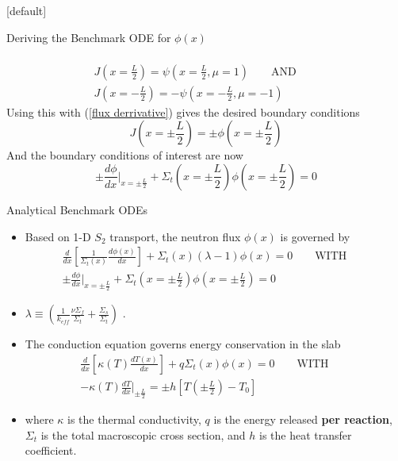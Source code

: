 \documentclass[9pt,t,aspectratio=169]{beamer}
\makeatletter
\newcommand{\QAND}{\qquad \text{AND} \qquad}
\newcommand{\QWITH}{\qquad \text{WITH} \qquad}
\newenvironment{withoutheadline}{
       \setbeamertemplate{headline}[default]
       \def\beamer@entrycode{\vspace*{-\headheight}}
    }{}
\makeatother
\begin{document}
\begin{withoutheadline}
\begin{frame}[allowframebreaks]{Deriving the Benchmark ODE for $\phi(x)$}
\begin{itemize}
\begin{multline}
        \end{multline}
        \vspace*{-0.4cm}
        \begin{multline}
            J(x=\frac{L}{2}) = \psi(x=\frac{L}{2},\mu =1) \QAND \\ J(x=-\frac{L}{2}) = - \psi(x=-\frac{L}{2},\mu =-1)
        \end{multline}
        Using this with (\ref{flux derrivative}) gives the desired boundary conditions
        \begin{equation}
            J(x=\pm \frac{L}{2}) = \pm \phi(x=\pm \frac{L}{2})
        \end{equation}
        And the boundary conditions of interest are now
        \begin{equation}
            \pm \frac{d\phi}{dx}\bigg|_{x=\pm \frac{L}{2}} +  \Sigma_{t}(x=\pm \frac{L}{2})  \phi(x=\pm \frac{L}{2})  = 0
        \end{equation}
    \end{itemize}
\end{frame}
\end{withoutheadline}

\begin{frame}{Analytical Benchmark ODEs}
    \vspace*{-0.25cm}
    \begin{itemize}
        \item Based on 1-D $S_{2}$ transport, the neutron flux $\phi(x)$ is governed by
        \begin{multline}
            \frac{d}{dx}\left\lbrack\frac{1}{\Sigma_{t}(x)} \frac{d\phi(x)}{dx} \right\rbrack + \Sigma_{t}(x)
            \left(\lambda - 1\right)\phi(x) = 0
            \QWITH \\
            \pm \frac{d\phi}{dx}\bigg|_{x=\pm \frac{L}{2}} +  \Sigma_{t}(x=\pm \frac{L}{2})  \phi(x=\pm \frac{L}{2})  = 0
        \end{multline}
        \item $\lambda \equiv (\frac{1}{k_{eff}}\frac{\nu \Sigma_{f}}{\Sigma_{t}} + \frac{\Sigma_{s}}{\Sigma_{t}} )$ \cite{analytical-benchmark}.
        \item The conduction equation governs energy conservation in the slab
        \begin{multline}
            \frac{d}{dx}\left\lbrack\kappa(T)\frac{dT(x)}{dx}\right\rbrack + q \Sigma_{t}(x)\phi(x) = 0
            \QWITH \\
            -\kappa(T) \frac{dT}{dx} \bigg|_{\pm \frac{L}{2}} = \pm h\left[ T(\pm \frac{L}{2}) - T_{0}\right]
        \end{multline}
        \item where $\kappa$ is the thermal conductivity, $q$ is the energy released \textbf{per reaction}, $\Sigma_{t}$ is the total macroscopic cross section, and $h$ is the heat transfer coefficient.
    \end{itemize}
\end{frame}
\end{document}
